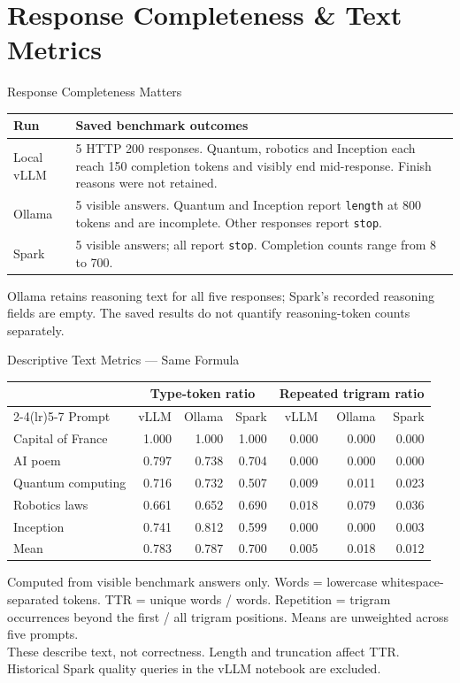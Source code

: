 \documentclass[aspectratio=169,12pt]{beamer}
\begin{document}
\section{Response Completeness \& Text Metrics}
\begin{frame}{Response Completeness Matters}
\begin{tabular}{p{}p{}}
\toprule
Run & Saved benchmark outcomes \\
\midrule
Local vLLM & 5 HTTP 200 responses. Quantum, robotics and Inception each reach 150 completion tokens and visibly end mid-response. Finish reasons were not retained. \\
Ollama & 5 visible answers. Quantum and Inception report \texttt{length} at 800 tokens and are incomplete. Other responses report \texttt{stop}. \\
Spark & 5 visible answers; all report \texttt{stop}. Completion counts range from 8 to 700. \\
\bottomrule
\end{tabular}
\vfill
\small Ollama retains reasoning text for all five responses; Spark's recorded reasoning fields are empty. The saved results do not quantify reasoning-token counts separately.
\end{frame}
\begin{frame}{Descriptive Text Metrics --- Same Formula}
\centering
\scriptsize
\begin{tabular}{lrrrrrr}
\toprule
& \multicolumn{3}{c}{Type-token ratio} & \multicolumn{3}{c}{Repeated trigram ratio} \\
\cmidrule(lr){2-4}\cmidrule(lr){5-7}
Prompt & vLLM & Ollama & Spark & vLLM & Ollama & Spark \\
\midrule
Capital of France & 1.000 & 1.000 & 1.000 & 0.000 & 0.000 & 0.000 \\
AI poem & 0.797 & 0.738 & 0.704 & 0.000 & 0.000 & 0.000 \\
Quantum computing & 0.716 & 0.732 & 0.507 & 0.009 & 0.011 & 0.023 \\
Robotics laws & 0.661 & 0.652 & 0.690 & 0.018 & 0.079 & 0.036 \\
Inception & 0.741 & 0.812 & 0.599 & 0.000 & 0.000 & 0.003 \\
\midrule
Mean & 0.783 & 0.787 & 0.700 & 0.005 & 0.018 & 0.012 \\

\bottomrule
\end{tabular}
\vfill
\footnotesize Computed from visible benchmark answers only. Words = lowercase whitespace-separated tokens. TTR = unique words / words. Repetition = trigram occurrences beyond the first / all trigram positions. Means are unweighted across five prompts.\\[0.5em]
These describe text, not correctness. Length and truncation affect TTR. Historical Spark quality queries in the vLLM notebook are excluded.
\end{frame}
\end{document}
